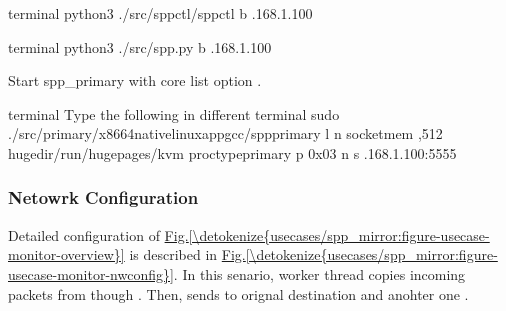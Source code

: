 \documentclass[a4paper,11pt,openany,oneside,english]{sphinxmanual}
\begin{document}
\begin{sphinxVerbatim}[commandchars=\\\{\},formatcom=\footnotesize]
 terminal 
 python3 ./src/spp\PYGZhy{}ctl/spp\PYGZhy{}ctl \PYGZhy{}b .168.1.100
\end{sphinxVerbatim}

\begin{sphinxVerbatim}[commandchars=\\\{\},formatcom=\footnotesize]
 terminal 
 python3 ./src/spp.py \PYGZhy{}b .168.1.100
\end{sphinxVerbatim}

Start spp\_primary with core list option .

\begin{sphinxVerbatim}[commandchars=\\\{\},formatcom=\footnotesize]
 terminal 
 Type the following in different terminal
 sudo ./src/primary/x86\PYGZus{}64\PYGZhy{}native\PYGZhy{}linuxapp\PYGZhy{}gcc/spp\PYGZus{}primary 
    \PYGZhy{}l  \PYGZhy{}n  
    \PYGZhy{}\PYGZhy{}socket\PYGZhy{}mem ,512 
    \PYGZhy{}\PYGZhy{}huge\PYGZhy{}dir/run/hugepages/kvm 
    \PYGZhy{}\PYGZhy{}proc\PYGZhy{}typeprimary 
    \PYGZhy{}\PYGZhy{} 
    \PYGZhy{}p 0x03 
    \PYGZhy{}n  \PYGZhy{}s .168.1.100:5555
\end{sphinxVerbatim}


\subsubsection{Netowrk Configuration}
\label{\detokenize{usecases/spp_mirror:netowrk-configuration}}
Detailed configuration of \hyperref[\detokenize{usecases/spp_mirror:figure-usecase-monitor-overview}]{Fig.\@ \ref{\detokenize{usecases/spp_mirror:figure-usecase-monitor-overview}}}
is described in \hyperref[\detokenize{usecases/spp_mirror:figure-usecase-monitor-nwconfig}]{Fig.\@ \ref{\detokenize{usecases/spp_mirror:figure-usecase-monitor-nwconfig}}}.
In this senario, worker thread  copies incoming packets
from though .
Then, sends to orignal destination  and anohter one .
\end{document}
